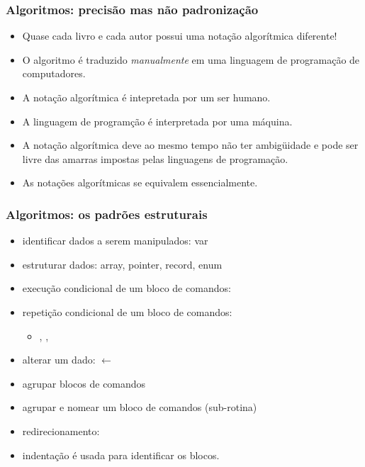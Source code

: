 \documentclass{beamer}
\begin{document}
\begin{frame}

  \frametitle{Algoritmos: precisão mas não padronização}

  \begin{itemize}
  \item Quase cada livro e cada autor possui uma notação algorítmica diferente!

  \item O algoritmo é traduzido \emph{manualmente} em uma linguagem de
    programação de computadores.

  \item A notação algorítmica é intepretada por um ser humano.

  \item A linguagem de programção é interpretada por uma máquina.

  \item A notação algorítmica deve ao mesmo tempo não ter ambigüidade e pode ser
    livre das amarras impostas pelas linguagens de programação.

  \item As notações algorítmicas se equivalem essencialmente.

  \end{itemize}

\end{frame}

\begin{frame}

  \frametitle{Algoritmos: os padrões estruturais}

  \begin{itemize}
  \item identificar dados a serem manipulados: var
  \item estruturar dados: array, pointer, record, enum
  \item execução condicional de um bloco de comandos: \If 
  \item repetição condicional de um bloco de comandos: \While
    \begin{itemize}
    \item \For, \To, \Downto
    \end{itemize}
  \item alterar um dado: $\gets$
  \item agrupar blocos de comandos
  \item agrupar e nomear um bloco de comandos (sub-rotina)
  \item redirecionamento: \Goto
  \item indentação é usada para identificar os blocos.
  \end{itemize}
\end{frame}
\end{document}
